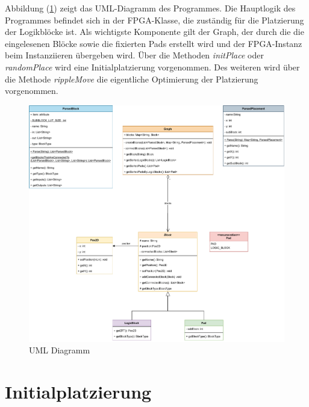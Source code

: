         Abbildung (\ref{fig:uml}) zeigt das UML-Diagramm des Programmes.
        Die Hauptlogik des Programmes befindet sich in der FPGA-Klasse,
        die zuständig für die Platzierung der Logikblöcke ist.
        Als wichtigste Komponente gilt der Graph, der durch die die eingelesenen Blöcke sowie die
        fixierten Pads erstellt wird und der FPGA-Instanz beim Instanziieren übergeben wird.
        Über die Methoden \textit{initPlace} oder \textit{randomPlace} wird eine Initialplatzierung vorgenommen.
        Des weiteren wird über die Methode \textit{rippleMove} die eigentliche Optimierung der Platzierung
        vorgenommen.
        \begin{figure}[H]
            \centering
            \includegraphics[width=\textwidth]{img/UML.pdf}
            \caption{UML Diagramm}
            \label{fig:uml}
        \end{figure}

    
        
    \section{Initialplatzierung}\label{sec:init}
     


